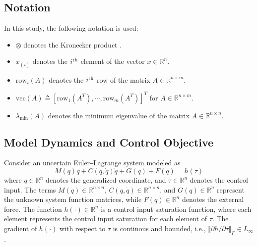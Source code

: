 \documentclass[lettersize,journal]{IEEEtran}
\begin{document}
\subsection{Notation}
In this study, the following notation is used:

\begin{itemize}
    \item $\otimes$ denotes the Kronecker product \cite{RN17}.
    \item $x_{(i)}$ denotes the $i\textsuperscript{th}$ element of the vector $x\in\mathbb R^n$.    
    \item $\text{row}_i(A)$ denotes the $i\textsuperscript{th}$ row of the matrix $A\in\mathbb{R}^{n\times m}$. 
    \item $\text{vec}(A)\triangleq [\text{row}_1(A^T)  ,\cdots,\text{row}_m(A^T)  ]^T   $ for $A\in\mathbb{R}^{n\times m}$.
    \item $\lambda_\text{min}(A)$ denotes the minimum eigenvalue of the matrix $A\in\mathbb{R}^{n\times n}$.
\end{itemize}

\subsection{Model Dynamics and Control Objective}

Consider an uncertain Euler‒Lagrange system modeled as
\begin{equation}
    M(q)\ddot q + C(q,\dot q)\dot q + G(q) + F(q) = h(\tau)
    \label{eq. system dynamics 1}
\end{equation}
where $q\in \mathbb{R}^n$ denotes the generalized coordinate, and $\tau\in\mathbb{R}^n$ denotes the control input. The terms $M(q)\in\mathbb{R}^{n\times n}$, $C(q,\dot q)\in\mathbb{R}^{n\times n}$, and $G(q)\in\mathbb{R}^{n}$ represent the unknown system function matrices, while $F(q)\in\mathbb{R}^{n}$ denotes the external force. The function $h(\cdot)\in \mathbb{R}^n$ is a control input saturation function, where each element represents the control input saturation for each element of $\tau$. The gradient of $h(\cdot)$ with respect to $\tau$ is continous and bounded, i.e., $\Vert\partial h/\partial \tau\Vert_F\in L_\infty$. 
\end{document}
